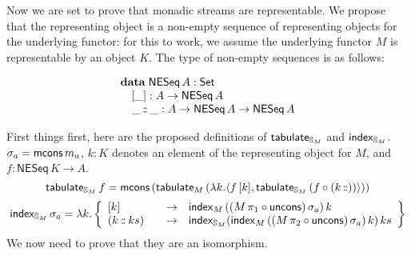 \documentclass{article}
\begin{document}
Now we are set to prove that monadic streams are representable. We propose that the representing object is a non-empty sequence of representing objects for the underlying functor: for this to work, we assume the underlying functor $M$ is representable by an object $K$. The type of non-empty sequences is as follows:

$$
\begin{array}[t]{l}
\mathbf{data}\;
\mathsf{NESeq}\,A:\mathsf{Set} \\
\quad [\_]: A \rightarrow \mathsf{NESeq}\,A \\
\quad \_\mathbin{:\hspace{-0.1em}:}\_ : A \rightarrow \mathsf{NESeq}\,A \rightarrow \mathsf{NESeq}\,A
\end{array}
$$

First things first, here are the proposed definitions of $\mathsf{tabulate}_{\mathbb{S}_{M}}$ and $\mathsf{index}_{\mathbb{S}_{M}}$. $\sigma_a = \mathsf{mcons}\, m_a$, $k : K$ denotes an element of the representing object for $M$, and $f : \mathsf{NESeq}\, K \to A$.
$$
\mathsf{tabulate}_{\mathbb{S}_{M}}\, f = \mathsf{mcons}\, (\mathsf{tabulate}_M \, (\lambda k. \langle f\, [k], \mathsf{tabulate}_{\mathbb{S}_{M}}\,(f \circ (k\, \mathbin{:\hspace{-0.1em}:})) \rangle ))
$$
$$
\indexf_{\stream{M}}\, \sigma_a = \lambda k . \left\{
\begin{array}{l@{\qquad}l l}
[k] & \to& \indexf_M\, ((M\,\pi_1 \circ \uncons)\,\sigma_a)\, k\\
(k \cons ks) &\to& \indexf_{\stream{M}} (\indexf_M\, ((M\,\pi_2 \circ \uncons)\, \sigma_a)\, k)\, ks
\end{array}
\right\}
$$
We now need to prove that they are an isomorphism.
\end{document}
